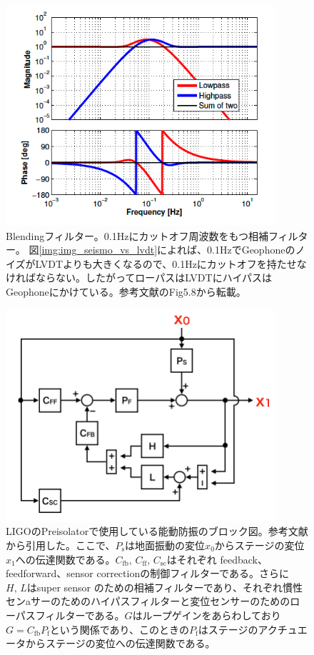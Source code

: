 \begin{figure}[H]
  \begin{center}
    \includegraphics[width=10.0cm]{../arm_length_compensation_system/img_pi_blending.png}
  \end{center}
  \caption{Blendingフィルター。0.1Hzにカットオフ周波数をもつ相補フィルター。
    図\ref{img:img_seismo_vs_lvdt}によれば、0.1HzでGeophoneのノイズがLVDTよりも大きくなるので、0.1Hzにカットオフを持たせなければならない。したがってローパスはLVDTにハイパスはGeophoneにかけている。参考文献\cite{sekiguchiD2016}のFig5.8から転載。}
  \label{img:img_pi_blending}
\end{figure}

\begin{figure}[H]
  \begin{center}
    \includegraphics[width=10.0cm]{../arm_length_compensation_system/img_2dof_pi.png}
  \end{center}
  \caption{LIGOのPreisolatorで使用している能動防振のブロック図。参考文献\cite{matichard2015seismic}から引用した。ここで、$P_{\mathrm{s}}$は地面振動の変位$x_0$からステージの変位$x_1$への伝達関数である。$C_{\mathrm{fb}},\,C_{\mathrm{ff}},\,C_{\mathrm{sc}}$はそれぞれ feedback、feedforward、sensor correctionの制御フィルターである。さらに$H,\,L$はsuper sensor のための相補フィルターであり、それぞれ慣性センaサーのためのハイパスフィルターと変位センサーのためのローパスフィルターである。$G$はループゲインをあらわしており$G=C_{\mathrm{fb}}P_{\mathrm{f}}$という関係であり、このときの$P_{\mathrm{f}}$はステージのアクチュエータからステージの変位への伝達関数である。}\label{img:img_2dof_pi}
\end{figure}

